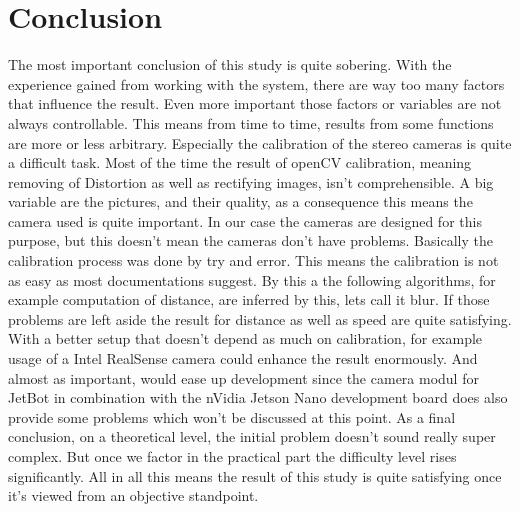 \documentclass[journal,onecolumn]{IEEEtran}
\begin{document}
\section{Conclusion}
\noindent The most important conclusion of this study is quite sobering. With the experience gained from working with the system, there are way too many factors that influence the result. Even more important those factors or variables are not always controllable. This means from time to time, results from some functions are more or less arbitrary. Especially the calibration of the stereo cameras is quite a difficult task. Most of the time the result of openCV calibration, meaning removing of Distortion as well as rectifying images, isn't comprehensible. A big variable are the pictures, and their quality, as a consequence this means the camera used is quite important. In our case the cameras are designed for this purpose, but this doesn't mean the cameras don't have problems. Basically the calibration process was done by try and error. This means the calibration is not as easy as most documentations suggest. By this a the following algorithms, for example computation of distance, are inferred by this, lets call it blur. \newline
If those problems are left aside the result for distance as well as speed are quite satisfying. With a better setup that doesn't depend as much on calibration, for example usage of a Intel RealSense camera could enhance the result enormously. And almost as important, would ease up development since the camera modul for JetBot in combination with the nVidia Jetson Nano development board does also provide some problems which won't be discussed at this point. \newline
As a final conclusion, on a theoretical level, the initial problem doesn't sound really super complex. But once we factor in the practical part the difficulty level rises significantly. All in all this means the result of this study is quite satisfying once it's viewed from an objective standpoint.
\appendices

%
{}


%
\end{document}
